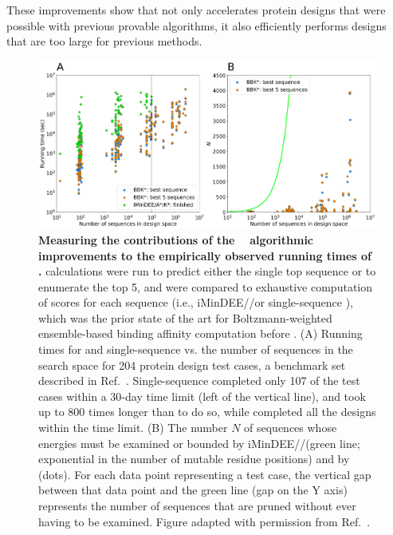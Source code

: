 These improvements show that \bbks not only accelerates protein designs that were possible with previous provable algorithms, it also efficiently performs designs that are too large for previous methods.

\begin{figure}
\center
\includegraphics[width=6.5in]{figures/bbks.png}
\caption{\textbf{Measuring the contributions of the \bbks~\cite{BBK*} algorithmic improvements to the empirically observed running times of \osprey.}  \bbks calculations were run to predict either the single top sequence or to enumerate the top 5, and were compared to exhaustive computation of \ks scores for each sequence (i.e., iMinDEE/\as/\ks or single-sequence \ks), which was the prior state of the art for Boltzmann-weighted ensemble-based binding affinity computation before \bbks.  (A) Running times for \bbks and single-sequence \ks vs. the number of sequences in the search space for 204 protein design test cases, a benchmark set described in Ref.~.  Single-sequence \ks completed only 107 of the test cases within a 30-day time limit (left of the vertical line), and took up to 800 times longer than \bbks to do so, while \bbks completed all the designs within the time limit.  (B) The number $N$ of sequences whose energies must be examined or bounded by iMinDEE/\as/\ks (green line; exponential in the number of mutable residue positions) and by \bbks (dots). For each data point representing a \bbks test case, the vertical gap between that data point and the green line (gap on the Y axis) represents the number of sequences that are pruned without ever having to be examined.  Figure adapted with permission from Ref.~.  }
\label{fig:bbks}
\end{figure}

